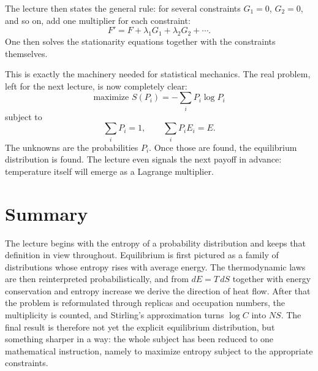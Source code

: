 The lecture then states the general rule: for several constraints \(G_1=0\), \(G_2=0\), and so on, add one multiplier for each constraint:
\begin{equation}
F' = F+\lambda_1 G_1+\lambda_2 G_2+\cdots.
\end{equation}
One then solves the stationarity equations together with the constraints themselves.

This is exactly the machinery needed for statistical mechanics. The real problem, left for the next lecture, is now completely clear:
\begin{equation}
\text{maximize } S(P_i)=-\sum_i P_i\log P_i
\end{equation}
subject to
\begin{equation}
\sum_i P_i=1,
\qquad
\sum_i P_iE_i=E.
\end{equation}
The unknowns are the probabilities \(P_i\). Once those are found, the equilibrium distribution is found. The lecture even signals the next payoff in advance: temperature itself will emerge as a Lagrange multiplier.

\section{Summary}

The lecture begins with the entropy of a probability distribution and keeps that definition in view throughout. Equilibrium is first pictured as a family of distributions whose entropy rises with average energy. The thermodynamic laws are then reinterpreted probabilistically, and from \(dE=T\,dS\) together with energy conservation and entropy increase we derive the direction of heat flow. After that the problem is reformulated through replicas and occupation numbers, the multiplicity is counted, and Stirling's approximation turns \(\log C\) into \(NS\). The final result is therefore not yet the explicit equilibrium distribution, but something sharper in a way: the whole subject has been reduced to one mathematical instruction, namely to maximize entropy subject to the appropriate constraints.